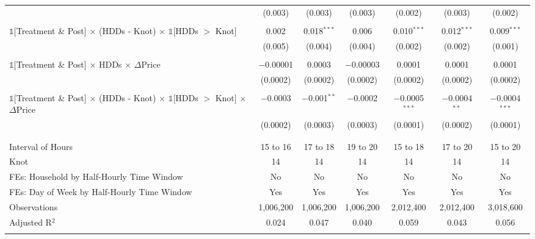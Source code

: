 \begin{table}[!htbp]
\begin{longtable}{@{\extracolsep{15pt}}lcccccc}
  & (0.003) & (0.003) & (0.003) & (0.002) & (0.003) & (0.002) \\ 
  & & & & & & \\ 
 $\mathbb{1}$[Treatment \& Post] $\times$ (HDDs - Knot) $\times$ $\mathbb{1}$[HDDs $>$ Knot] & 0.002 & 0.018$^{***}$ & 0.006 & 0.010$^{***}$ & 0.012$^{***}$ & 0.009$^{***}$ \\ 
  & (0.005) & (0.004) & (0.004) & (0.002) & (0.002) & (0.001) \\ 
  & & & & & & \\ 
 $\mathbb{1}$[Treatment \& Post] $\times$ HDDs $\times$ $\Delta$Price & $-$0.00001 & 0.0003 & $-$0.00003 & 0.0001 & 0.0001 & 0.0001 \\ 
  & (0.0002) & (0.0002) & (0.0002) & (0.0002) & (0.0002) & (0.0002) \\ 
  & & & & & & \\ 
 $\mathbb{1}$[Treatment \& Post] $\times$ (HDDs - Knot) $\times$ $\mathbb{1}$[HDDs $>$ Knot] $\times$ $\Delta$Price & $-$0.0003 & $-$0.001$^{**}$ & $-$0.0002 & $-$0.0005$^{***}$ & $-$0.0004$^{**}$ & $-$0.0004$^{***}$ \\ 
  & (0.0002) & (0.0003) & (0.0003) & (0.0001) & (0.0002) & (0.0001) \\ 
  & & & & & & \\ 
\hline \\[-1.8ex] 
Interval of Hours & 15 to 16 & 17 to 18 & 19 to 20 & 15 to 18 & 17 to 20 & 15 to 20 \\ 
Knot & 14 & 14 & 14 & 14 & 14 & 14 \\ 
FEs: Household by Half-Hourly Time Window & No & No & No & No & No & No \\ 
FEs: Day of Week by Half-Hourly Time Window & Yes & Yes & Yes & Yes & Yes & Yes \\ 
Observations & 1,006,200 & 1,006,200 & 1,006,200 & 2,012,400 & 2,012,400 & 3,018,600 \\ 
Adjusted R$^{2}$ & 0.024 & 0.047 & 0.040 & 0.059 & 0.043 & 0.056 \\ 
\hline 
\hline \\[-1.8ex] 
\end{longtable} 
\end{table} 
